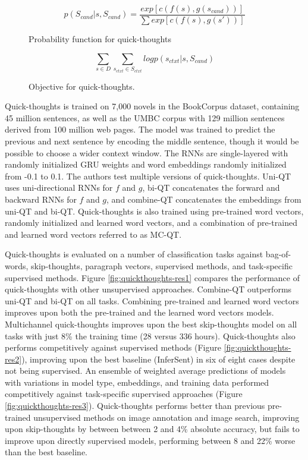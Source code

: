 \begin{figure}[h!]
    \centering
    $$
    p(S_{cand}|s, S_{cand}) = \frac{exp[c(f(s),g(s_{cand}))]}{\sum exp[c(f(s),g(s'))]}
    $$
    \caption{Probability function for quick-thoughts}
    \label{fig:quickthoughts-prob}
\end{figure}

\begin{figure}[h!]
    \centering
    $$
    \sum\limits_{s \in D} \sum\limits_{s_{ctxt} \in S_{ctxt}} log p(s_{ctxt} | s, S_{cand})
    $$
    \caption{Objective for quick-thoughts.}
    \label{fig:quickthoughts-obj}
\end{figure}

Quick-thoughts is trained on 7,000 novels in the BookCorpus dataset, containing 45 million sentences, as well as the UMBC corpus with 129 million sentences derived from 100 million web pages. The model was trained to predict the previous and next sentence by encoding the middle sentence, though it would be possible to choose a wider context window. The RNNs are single-layered with randomly initialized GRU weights and word embeddings randomly initialized from -0.1 to 0.1. The authors test multiple versions of quick-thoughts. Uni-QT uses uni-directional RNNs for $f$ and $g$, bi-QT concatenates the forward and backward RNNs for $f$ and $g$, and combine-QT concatenates the embeddings from uni-QT and bi-QT. Quick-thoughts is also trained using pre-trained word vectors, randomly initialized and learned word vectors, and a combination of pre-trained and learned word vectors referred to as MC-QT. 

Quick-thoughts is evaluated on a number of classification tasks against bag-of-words, skip-thoughts, paragraph vectors, supervised methods, and task-specific supervised methods. Figure \ref{fig:quickthoughts-res1} compares the performance of quick-thoughts with other unsupervised approaches. Combine-QT outperforms uni-QT and bi-QT on all tasks. Combining pre-trained and learned word vectors improves upon both the pre-trained and the learned word vectors models. Multichannel quick-thoughts improves upon the best skip-thoughts model on all tasks with just 8\% the training time (28 versus 336 hours). Quick-thoughts also performs competitively against supervised methods (Figure \ref{fig:quickthoughts-res2}), improving upon the best baseline (InferSent) in six of eight cases despite not being supervised. An ensemble of weighted average predictions of models with variations in model type, embeddings, and training data performed competitively against task-specific supervised approaches (Figure \ref{fig:quickthoughts-res3}). Quick-thoughts performs better than previous pre-trained unsupervised methods on image annotation and image search, improving upon skip-thoughts by between between 2 and 4\% absolute accuracy, but fails to improve upon directly supervised models, performing between 8 and 22\% worse than the best baseline.

